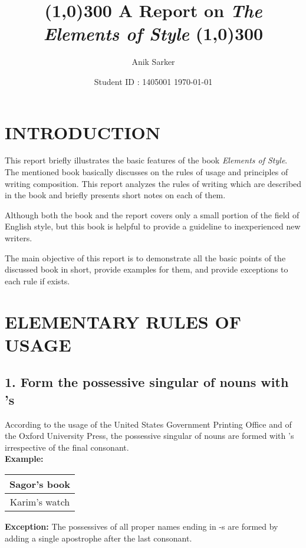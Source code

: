 \documentclass{report}
\title{
\line(1,0){300}
\endgraf\bigskip
\Huge
\bfseries{A Report on}
\endgraf\bigskip
\emph{The Elements of Style}
\newline
\line(1,0){300}
\bigskip
\bigskip
}
\author{\Large{Anik Sarker}}
\date{
\Large{Student ID : 1405001}
\endgraf\bigskip
\Large{\today}
}
\newcommand{\DoubleRowSingleCol}[2]{
    \begin{center}
    \begin{tabular}{|c|}
     \hline
     #1\\\hline
     #2\\\hline
    \end{tabular}
    \end{center}
}
\begin{document}
\maketitle
\renewcommand{\familydefault}{\sfdefault}

\tableofcontents

\chapter{INTRODUCTION}
This report briefly illustrates the basic features of the book \textit{Elements of Style}. The mentioned book basically discusses on the rules of usage and principles of writing composition. This report analyzes the rules of writing which are described in the book and briefly presents short notes on each of them. 

\bigskip

Although both the book and the report covers only a small portion of the field of English style, but this book is helpful to provide a guideline to inexperienced new writers.

\bigskip

The main objective of this report is to demonstrate all the basic points of the discussed book in short, provide examples for them, and provide exceptions to each rule if exists. 

\newpage


\chapter{ELEMENTARY RULES OF USAGE}{\label{chap:lab}}
\section*{1. Form the possessive singular of nouns with ’s}

According to the usage of the United States Government Printing Office and of the Oxford
University Press, the possessive singular of nouns are formed with ’s irrespective of the final consonant.\\

\textbf{Example:}
\DoubleRowSingleCol{Sagor’s book}{Karim’s watch}

{\Large\textbf{Exception:}}
The possessives of all proper names ending in -s are formed by adding a single apostrophe after the last consonant.

\endgraf\bigskip
\end{document}
